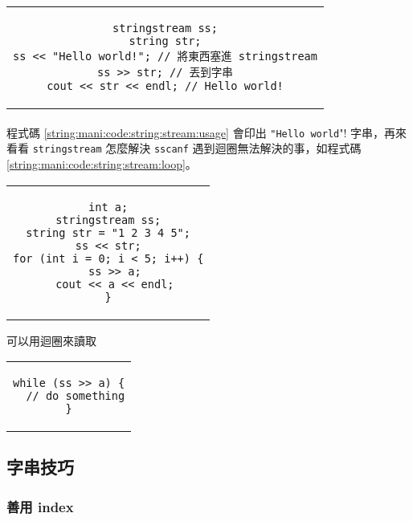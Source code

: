 \documentclass[12pt,a4paper,oneside]{article}
\begin{document}
\begin{CJK}{UTF8}{bkai}
\begin{code}[h!]
  \centering
  \begin{tabular}{c}
  \begin{lstlisting}
stringstream ss;
string str;
ss << "Hello world!"; // 將東西塞進 stringstream
ss >> str; // 丟到字串
cout << str << endl; // Hello world!
  \end{lstlisting}
  \end{tabular}
  \caption{\lstinline!stringstream! 基本用法}
  \label{string:mani:code:string:stream:usage}
\end{code}

\paragraph{}程式碼 \ref{string:mani:code:string:stream:usage} 會印出 \lstinline!"Hello world!"! 字串，再來看看 \lstinline!stringstream! 怎麼解決 \lstinline!sscanf! 遇到迴圈無法解決的事，如程式碼 \ref{string:mani:code:string:stream:loop}。

\begin{code}[h!]
  \centering
  \begin{tabular}{c}
  \begin{lstlisting}
int a;
stringstream ss;
string str = "1 2 3 4 5";
ss << str;
for (int i = 0; i < 5; i++) {
  ss >> a;
  cout << a << endl;
}
  \end{lstlisting}
  \end{tabular}
  \caption{可以用迴圈來讀取}
  \label{string:mani:code:string:stream:loop}
\end{code}

\begin{code}[h!]
  \centering
  \begin{tabular}{c}
  \begin{lstlisting}
while (ss >> a) {
  // do something
}
  \end{lstlisting}
  \end{tabular}
  \caption{\lstinline!stringstream! 碰到 EOF}
  \label{string:mani:code:string:stream:eof}
\end{code}

\subsection{字串技巧}

\subsubsection{善用 index}


\end{CJK}
\end{document}
